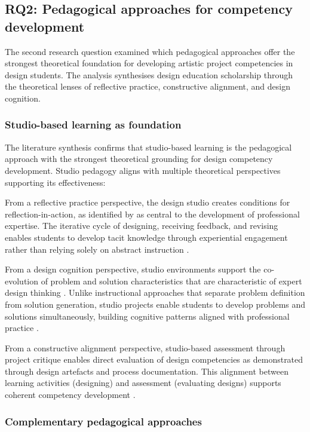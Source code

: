 \documentclass[ed]{acnsart}
\begin{document}
	\subsection{RQ2: Pedagogical approaches for competency development}
	
	The second research question examined which pedagogical approaches offer the strongest theoretical foundation for developing artistic project competencies in design students. The analysis synthesises design education scholarship through the theoretical lenses of reflective practice, constructive alignment, and design cognition.
	
	\subsubsection{Studio-based learning as foundation}
	
	The literature synthesis confirms that studio-based learning is the pedagogical approach with the strongest theoretical grounding for design competency development. Studio pedagogy aligns with multiple theoretical perspectives supporting its effectiveness:
	
	From a reflective practice perspective, the design studio creates conditions for reflection-in-action, as identified by \citet{Schon1983} as central to the development of professional expertise. The iterative cycle of designing, receiving feedback, and revising enables students to develop tacit knowledge through experiential engagement rather than relying solely on abstract instruction \cite{Mewburn2012363}.
	
	From a design cognition perspective, studio environments support the co-evolution of problem and solution characteristics that are characteristic of expert design thinking \cite{Cross2011}. Unlike instructional approaches that separate problem definition from solution generation, studio projects enable students to develop problems and solutions simultaneously, building cognitive patterns aligned with professional practice \cite{Lawson2005}.
	
	From a constructive alignment perspective, studio-based assessment through project critique enables direct evaluation of design competencies as demonstrated through design artefacts and process documentation. This alignment between learning activities (designing) and assessment (evaluating designs) supports coherent competency development \cite{Biggs1996}.
	
	\subsubsection{Complementary pedagogical approaches}
	
\end{document}
